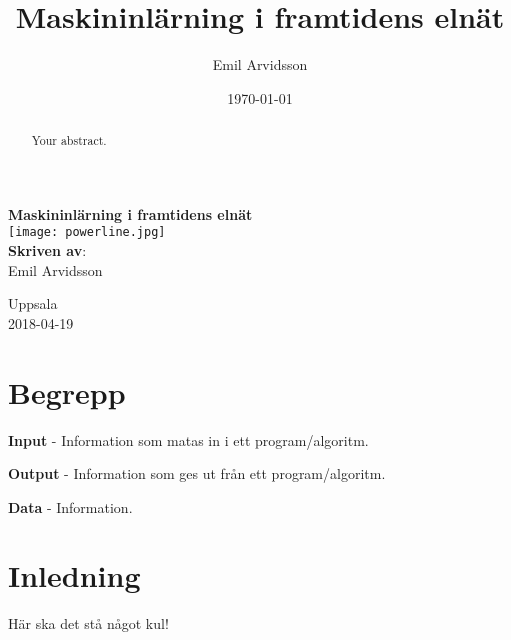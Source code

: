 \documentclass[a4paper]{article}
\title{Maskininlärning i framtidens elnät}
\author{Emil Arvidsson}
\date{\today}
\begin{document}
\begin{titlepage}
\doublespacing
\centering 
\vspace{2 cm}
{\LARGE {\bf Maskininlärning i framtidens elnät}}  \\
\vspace{1 cm}
\centering \texttt{[image: powerline.jpg]} \\	
\vspace{1 cm}
{\bf Skriven av}:\\ Emil Arvidsson\\        
\vspace{3 cm} 


Uppsala \\ 2018-04-19
\end{titlepage}


\clearpage










\begin{abstract}
Your abstract.
\end{abstract}

\clearpage

\tableofcontents

\clearpage

\section*{Begrepp}

\begin{description}
\item \textbf{Input} - Information som matas in i ett program/algoritm.
\item \textbf{Output} - Information som ges ut från ett program/algoritm.
\item \textbf{Data} - Information.

\end{description}

\clearpage

\section{Inledning}

Här ska det stå något kul!
\end{document}

